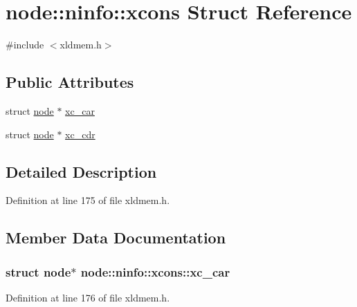 \hypertarget{structnode_1_1ninfo_1_1xcons}{}\section{node\+:\+:ninfo\+:\+:xcons Struct Reference}
\label{structnode_1_1ninfo_1_1xcons}


{\ttfamily \#include $<$xldmem.\+h$>$}

\subsection*{Public Attributes}
\begin{DoxyCompactItemize}
\item 
struct \hyperlink{structnode}{node} $\ast$ \hyperlink{structnode_1_1ninfo_1_1xcons_a092dfda2dad8f4569bc5a2a2c459cc53}{xc\+\_\+car}
\item 
struct \hyperlink{structnode}{node} $\ast$ \hyperlink{structnode_1_1ninfo_1_1xcons_a97ea0e684b1deb96bda20bdc9539aac7}{xc\+\_\+cdr}
\end{DoxyCompactItemize}


\subsection{Detailed Description}


Definition at line 175 of file xldmem.\+h.



\subsection{Member Data Documentation}
\subsubsection[{\texorpdfstring{xc\+\_\+car}{xc_car}}]{\setlength{\rightskip}{0pt plus 5cm}struct {\bf node}$\ast$ node\+::ninfo\+::xcons\+::xc\+\_\+car}\hypertarget{structnode_1_1ninfo_1_1xcons_a092dfda2dad8f4569bc5a2a2c459cc53}{}\label{structnode_1_1ninfo_1_1xcons_a092dfda2dad8f4569bc5a2a2c459cc53}


Definition at line 176 of file xldmem.\+h.

